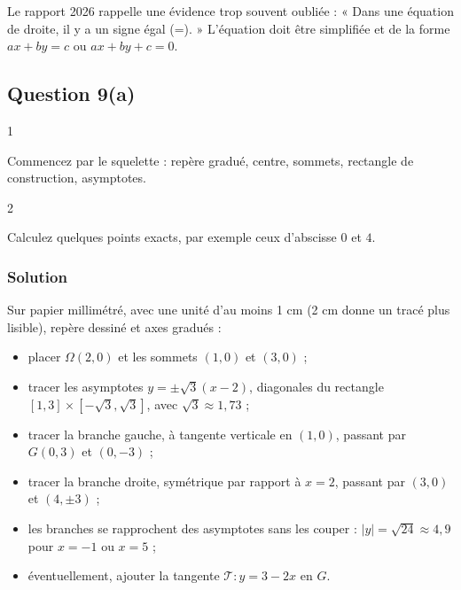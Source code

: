 \documentclass[11pt,a4paper]{article}
\providecommand{\tightlist}{\setlength{\itemsep}{0pt}\setlength{\parskip}{0pt}}
\begin{document}
\begin{jury}

Le rapport 2026 rappelle une évidence trop souvent oubliée : « Dans une équation de droite, il y a un signe égal (=). » L'équation doit être simplifiée et de la forme \(ax+by=c\) ou \(ax+by+c=0\).

\end{jury}

\hypertarget{question-9a-1}{%
\subsection{Question 9(a)}\label{question-9a-1}}

\begin{indication}{1}

Commencez par le squelette : repère gradué, centre, sommets, rectangle de construction, asymptotes.

\end{indication}

\begin{indication}{2}

Calculez quelques points exacts, par exemple ceux d'abscisse \(0\) et \(4\).

\end{indication}

\hypertarget{solution-29}{%
\subsubsection{Solution}\label{solution-29}}

Sur papier millimétré, avec une unité d'au moins 1 cm (2 cm donne un tracé plus lisible), repère dessiné et axes gradués :

\begin{itemize}
\tightlist
\item
  placer \(\Omega(2,0)\) et les sommets \((1,0)\) et \((3,0)\) ;
\item
  tracer les asymptotes \(y=\pm\sqrt3(x-2)\), diagonales du rectangle \([1,3]\times[-\sqrt3,\sqrt3]\), avec \(\sqrt3\approx1{,}73\) ;
\item
  tracer la branche gauche, à tangente verticale en \((1,0)\), passant par \(G(0,3)\) et \((0,-3)\) ;
\item
  tracer la branche droite, symétrique par rapport à \(x=2\), passant par \((3,0)\) et \((4,\pm3)\) ;
\item
  les branches se rapprochent des asymptotes sans les couper : \(|y|=\sqrt{24}\approx4{,}9\) pour \(x=-1\) ou \(x=5\) ;
\item
  éventuellement, ajouter la tangente \(\mathcal{T}:y=3-2x\) en \(G\).
\end{itemize}
\end{document}
